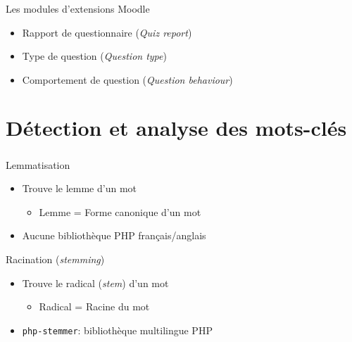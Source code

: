\documentclass{beamer}
\begin{document}
  \begin{frame}
    \frametitle{\insertsection}
    \begin{block}{Les modules d'extensions Moodle}
      \begin{itemize}
        \item Rapport de questionnaire (\textit{Quiz report})
        \item Type de question (\textit{Question type})
        \item Comportement de question (\textit{Question behaviour})
      \end{itemize}
    \end{block}
  \end{frame}
  
  \section[Mots-cl\'es]{D\'etection et analyse des mots-cl\'es}
  \begin{frame}
    \frametitle{\insertsection}
    \begin{block}{Lemmatisation}
      \begin{itemize}
        \item Trouve le lemme d'un mot
              \begin{itemize}
                      \item Lemme = Forme \alert{canonique} d'un mot
                      \end{itemize}

       \medskip
       \item Aucune biblioth\`eque PHP fran\c{c}ais/anglais
      \end{itemize}
    \end{block}
  
    \vfill
    \pause
  
    \begin{block}{Racination (\textit{stemming})}
      \begin{itemize}
        \item Trouve le radical (\textit{stem}) d'un mot
        \begin{itemize}
        \item Radical = Racine du mot
        \end{itemize}

       \medskip
        \item \texttt{php-stemmer}: biblioth\`eque multilingue PHP
      \end{itemize}
    \end{block}
    \vfill
  \end{frame}
  
\end{document}
